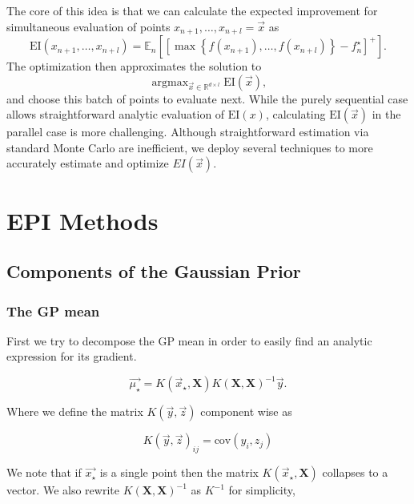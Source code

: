 \documentclass[phd,tocprelim]{cornell}
\DeclareMathOperator*{\argmax}{argmax}
\begin{document}
The core of this idea is that we can calculate the expected improvement for simultaneous evaluation of points $x_{n+1}, \ldots, x_{n+l} = \vec{x}$ as
\begin{equation}
 \mbox{EI}(x_{n+1}, \ldots, x_{n+l}) = \mathbb{E}_{n}\left[\left[\max\left\{f(x_{n+1}), \ldots, f(x_{n+l})\right\} - f_{n}^{\star}\right]^{+}\right].
\end{equation}
The optimization then approximates the solution to
\begin{equation}
 \argmax_{\vec{x} \in \mathbb{R}^{d \times l}} \mbox{EI}(\vec{x}),
\end{equation}
and choose this batch of points to evaluate next. While the purely sequential case allows straightforward analytic evaluation of $\mbox{EI}(x)$, calculating $\mbox{EI}(\vec{x})$ in the parallel case is more challenging. Although straightforward estimation via standard Monte Carlo are inefficient, we deploy several techniques to more accurately estimate and optimize $EI(\vec{x})$.


\chapter{EPI Methods} %
\label{cha:EPI Methods}

\section{Components of the Gaussian Prior}

\subsection{The GP mean}

First we try to decompose the GP mean in order to easily find an analytic expression for its gradient.

\begin{equation}
 \vec{\mu_{\star}} = K(\vec{x}_{\star}, \textbf{X} )K(\textbf{X},\textbf{X})^{-1}\vec{y}.
\end{equation}

Where we define the matrix $K(\vec{y}, \vec{z})$ component wise as

\begin{equation}
 K(\vec{y}, \vec{z})_{ij} = \mbox{cov}(y_{i}, z_{j})
\end{equation}

We note that if $\vec{x_{\star}}$ is a single point then the matrix $K(\vec{x}_{\star}, \textbf{X} )$ collapses to a vector. We also rewrite $K(\textbf{X},\textbf{X})^{-1}$ as $K^{-1}$ for simplicity,
\end{document}
